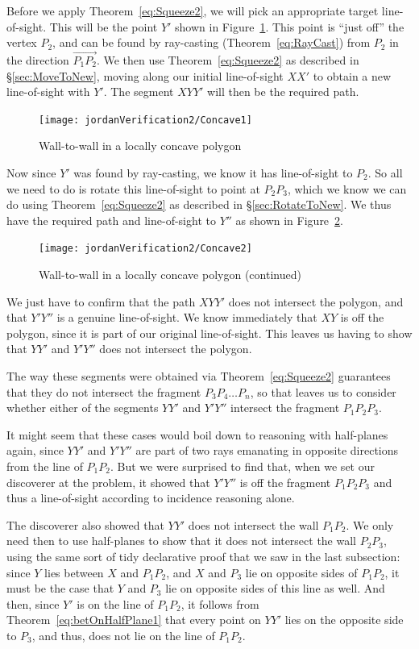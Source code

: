 Before we apply Theorem~\ref{eq:Squeeze2}, we will pick an appropriate target line-of-sight. This will be the point $Y'$ shown in Figure~\ref{fig:Concave1}. This point is ``just off'' the vertex $P_2$, and can be found by ray-casting (Theorem~\ref{eq:RayCast}) from $P_2$ in the direction $\overrightarrow{P_1P_2}$. We then use Theorem~\ref{eq:Squeeze2} as described in \S\ref{sec:MoveToNew}, moving along our initial line-of-sight $XX'$ to obtain a new line-of-sight with $Y'$. The segment $XYY'$ will then be the required path.

\begin{figure}
\centering\texttt{[image: jordanVerification2/Concave1]}
\caption{Wall-to-wall in a locally concave polygon}
\label{fig:Concave1}
\end{figure}

Now since $Y'$ was found by ray-casting, we know it has line-of-sight to $P_2$. So all we need to do is rotate this line-of-sight to point at $P_2P_3$, which we know we can do using Theorem~\ref{eq:Squeeze2} as described in \S\ref{sec:RotateToNew}. We thus have the required path and line-of-sight to $Y''$ as shown in Figure~\ref{fig:Concave2}.

\begin{figure}
\centering\texttt{[image: jordanVerification2/Concave2]}
\caption{Wall-to-wall in a locally concave polygon (continued)}
\label{fig:Concave2}
\end{figure}

We just have to confirm that the path $XYY'$ does not intersect the polygon, and that $Y'Y''$ is a genuine line-of-sight. We know immediately that $XY$ is off the polygon, since it is part of our original line-of-sight. This leaves us having to show that $YY'$ and $Y'Y''$ does not intersect the polygon. 

The way these segments were obtained via Theorem~\ref{eq:Squeeze2} guarantees that they do not intersect the fragment $P_3P_4\ldots P_n$, so that leaves us to consider whether either of the segments $YY'$ and $Y'Y''$ intersect the fragment $P_1P_2P_3$. 

It might seem that these cases would boil down to reasoning with half-planes again, since $YY'$ and $Y'Y''$ are part of two rays emanating in opposite directions from the line of $P_1P_2$. But we were surprised to find that, when we set our discoverer at the problem, it showed that $Y'Y''$ is off the fragment $P_1P_2P_3$ and thus a line-of-sight according to incidence reasoning alone.

The discoverer also showed that $YY'$ does not intersect the wall $P_1P_2$. We only need then to use half-planes to show that it does not intersect the wall $P_2P_3$, using the same sort of tidy declarative proof that we saw in the last subsection: since $Y$ lies between $X$ and $P_1P_2$, and $X$ and $P_3$ lie on opposite sides of $P_1P_2$, it must be the case that $Y$ and $P_3$ lie on opposite sides of this line as well. And then, since $Y'$ is on the line of $P_1P_2$, it follows from Theorem~\ref{eq:betOnHalfPlane1} that every point on $YY'$ lies on the opposite side to $P_3$, and thus, does not lie on the line of $P_1P_2$. 

